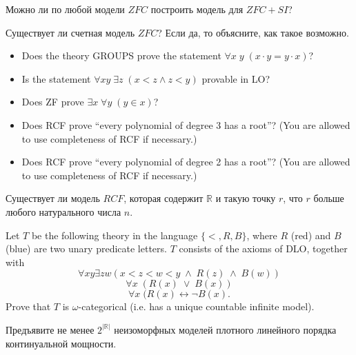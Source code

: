 \setcounter{curtask}{6}


\begin{task}
    Можно ли по любой модели $ZFC$ построить модель для $ZFC + SI$?
\end{task}

\begin{task}
    Существует ли счетная модель $ZFC$? Если да, то объясните, как такое возможно.
\end{task}

\begin{task}
    \begin{itemize}
        \item Does the theory GROUPS prove the statement $\forall x\; y\;
        	(x\cdot y = y \cdot x)$?
        \item Is the statement $\forall xy\; \exists z\; (x<z \wedge z<y)$ provable
	    in LO?
    	\item Does ZF prove $\exists x \; \forall y\; (y\in x)$?
    	\item Does RCF prove ``every polynomial of degree 3 has a root''?
			(You are allowed to use completeness of RCF if necessary.)
		 \item Does RCF prove ``every polynomial of degree 2 has a root''? 
			 (You are allowed to use completeness of RCF if necessary.)
    \end{itemize}
\end{task}

\begin{task}
  	Существует ли модель $RCF$, которая содержит $\mathbb{R}$ и такую точку $r$, что
    $r$ больше любого натурального числа $n$.
\end{task}

\breakline

\begin{ptask}{4}
    Let $T$ be the following theory in the language $\{<, R, B\}$, where $R$ (red) and $B$ (blue) are two unary predicate letters.
	$T$ consists of the axioms of DLO, together with 
	\[ \forall xy \exists zw (x<z<w<y \; \wedge \; R(z) \; \wedge \; B(w)) \]
	\[ \forall x \; (R(x)\; \vee \; B(x)) \]
	\[ \forall x \; (R(x) \leftrightarrow \neg B(x). \]
	Prove that $T$ is $\omega$-categorical (i.e. has a unique countable infinite model).
\end{ptask}

\begin{ptask}{5}
    Предъявите не менее $2^{|\mathbb{R}|}$ неизоморфных моделей плотного линейного порядка
    континуальной мощности.
\end{ptask}
